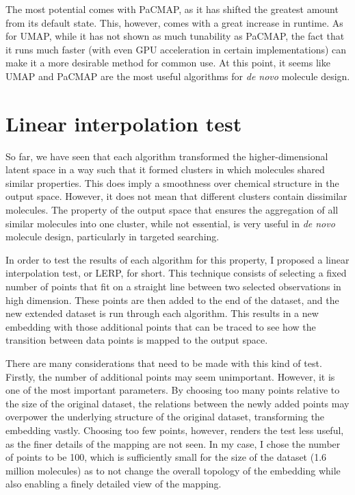 The most potential comes with PaCMAP, as it has shifted the greatest amount from its default state. This, however, comes with a great increase in runtime. As for UMAP, while it has not shown as much tunability as PaCMAP, the fact that it runs much faster (with even GPU acceleration in certain implementations) can make it a more desirable method for common use. At this point, it seems like UMAP and PaCMAP are the most useful algorithms for \textit{de novo} molecule design.

\section{Linear interpolation test}\label{sec:linear-interpolation-test}

So far, we have seen that each algorithm transformed the higher-dimensional latent space in a way such that it formed clusters in which molecules shared similar properties. This does imply a smoothness over chemical structure in the output space. However, it does not mean that different clusters contain dissimilar molecules. The property of the output space that ensures the aggregation of all similar molecules into one cluster, while not essential, is very useful in \textit{de novo} molecule design, particularly in targeted searching.

In order to test the results of each algorithm for this property, I proposed a linear interpolation test, or LERP, for short. This technique consists of selecting a fixed number of points that fit on a straight line between two selected observations in high dimension. These points are then added to the end of the dataset, and the new extended dataset is run through each algorithm. This results in a new embedding with those additional points that can be traced to see how the transition between data points is mapped to the output space.

There are many considerations that need to be made with this kind of test. Firstly, the number of additional points may seem unimportant. However, it is one of the most important parameters. By choosing too many points relative to the size of the original dataset, the relations between the newly added points may overpower the underlying structure of the original dataset, transforming the embedding vastly. Choosing too few points, however, renders the test less useful, as the finer details of the mapping are not seen. In my case, I chose the number of points to be 100, which is sufficiently small for the size of the dataset (1.6 million molecules) as to not change the overall topology of the embedding while also enabling a finely detailed view of the mapping.

